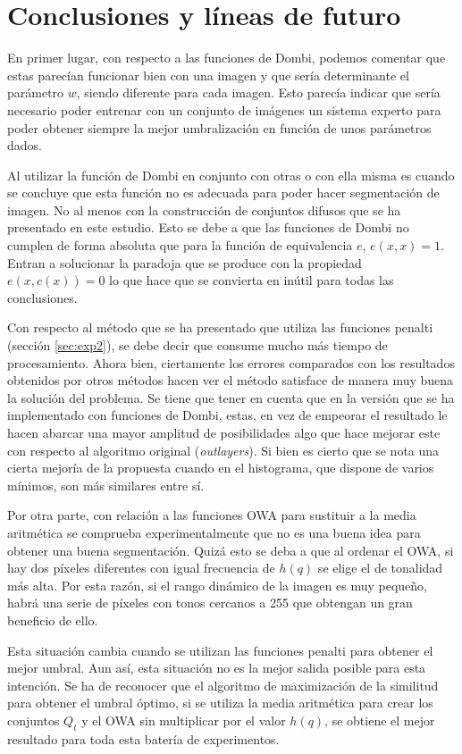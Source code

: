 \chapter{Conclusiones y líneas de futuro}\label{cap:conclusiones}

En primer lugar, con respecto a las funciones de Dombi, podemos comentar que estas parecían funcionar bien con una imagen y que sería determinante el parámetro $w$, siendo diferente para cada imagen. Esto parecía indicar que sería necesario poder entrenar con un conjunto de imágenes un sistema experto para poder obtener siempre la mejor umbralización en función de unos parámetros dados. 

Al utilizar la función de Dombi en conjunto con otras o con ella misma es cuando se concluye que esta función no es adecuada para poder hacer segmentación de imagen. No al menos con la construcción de conjuntos difusos que se ha presentado en este estudio. Esto se debe a que las funciones de Dombi no cumplen de forma absoluta que para la función de equivalencia $e$, $e(x,x)=1$. Entran a solucionar la paradoja que se produce con la propiedad $e(x,c(x))=0$ lo que hace que se convierta en inútil para todas las conclusiones.

Con respecto al método que se ha presentado que utiliza las funciones penalti (sección \ref{sec:exp2}), se debe decir que consume mucho más tiempo de procesamiento. Ahora bien, ciertamente los errores comparados con los resultados obtenidos por otros métodos hacen ver el método satisface de manera muy buena la solución del problema. Se tiene que tener en cuenta que en la versión que se ha implementado con funciones de Dombi, estas, en vez de empeorar el resultado le hacen abarcar una mayor amplitud de posibilidades algo que hace mejorar este con respecto al algoritmo original ({\em outlayers}). Si bien es cierto que se nota una cierta mejoría de la propuesta cuando en el histograma, que dispone de varios mínimos, son más similares entre sí.

Por otra parte, con relación a las funciones OWA para sustituir a la media aritmética se comprueba experimentalmente que no es una buena idea para obtener una buena segmentación. Quizá esto se deba a que al ordenar el OWA, si hay dos píxeles diferentes con igual frecuencia de $h(q)$ se elige el de tonalidad más alta. Por esta razón, si el rango dinámico de la imagen es muy pequeño, habrá una serie de píxeles con tonos cercanos a 255 que obtengan un gran beneficio de ello. 

Esta situación cambia cuando se utilizan las funciones penalti para obtener el mejor umbral. Aun así, esta situación no es la mejor salida posible para esta intención. Se ha de reconocer que el algoritmo de maximización de la similitud para obtener el umbral óptimo, si se utiliza la media aritmética para crear los conjuntos $Q_t$ y el OWA sin multiplicar por el valor $h(q)$, se obtiene el mejor resultado para toda esta batería de experimentos. 

